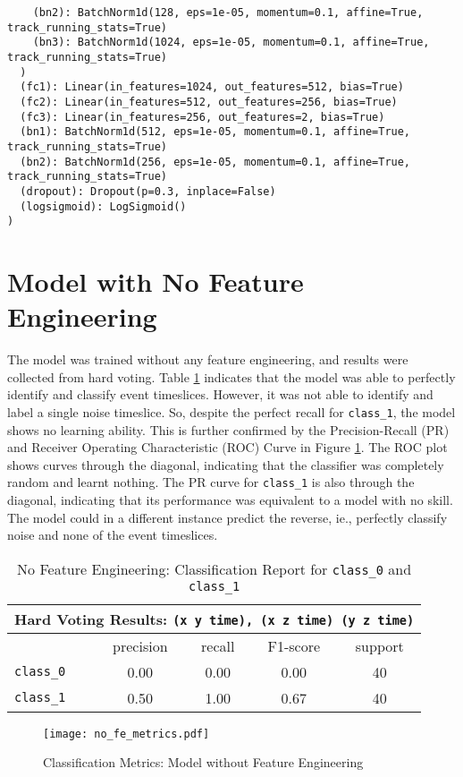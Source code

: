\begin{verbatim}
    (bn2): BatchNorm1d(128, eps=1e-05, momentum=0.1, affine=True,                                             track_running_stats=True)
    (bn3): BatchNorm1d(1024, eps=1e-05, momentum=0.1, affine=True,                                            track_running_stats=True)
  )
  (fc1): Linear(in_features=1024, out_features=512, bias=True)
  (fc2): Linear(in_features=512, out_features=256, bias=True)
  (fc3): Linear(in_features=256, out_features=2, bias=True)
  (bn1): BatchNorm1d(512, eps=1e-05, momentum=0.1, affine=True,                                                 track_running_stats=True)
  (bn2): BatchNorm1d(256, eps=1e-05, momentum=0.1, affine=True,                                                 track_running_stats=True)
  (dropout): Dropout(p=0.3, inplace=False)
  (logsigmoid): LogSigmoid()
)
\end{verbatim}

\section*{Model with No Feature Engineering}
\label{appendix-no-fe}

The model was trained without any feature engineering, and results were collected from hard voting. Table \ref{tab:no_fe_classification_report} indicates that the model was able to perfectly identify and classify event timeslices. However, it was not able to identify and label a single noise timeslice. So, despite the perfect recall for \texttt{class\_1}, the model shows no learning ability. This is further confirmed by the Precision-Recall (PR) and Receiver Operating Characteristic (ROC) Curve in Figure \ref{fig:ncm_no_fe}. The ROC plot shows curves through the diagonal, indicating that the classifier was completely random and learnt nothing. The PR curve for \texttt{class\_1} is also through the diagonal, indicating that its performance was equivalent to a model with no skill. The model could in a different instance predict the reverse, ie., perfectly classify noise and none of the event timeslices.

\begin{table} [ht!]
    \centering
    \begin{tabular}{l c c c c}
    \hline
    \multicolumn{5}{c}{Hard Voting Results: \texttt{(x y time), (x z time) (y z time)}} \\
    \hline
                     & precision & recall & F1-score & support \\
        \texttt{class\_0} & 0.00 &  0.00    & 0.00 & 40\\
        \texttt{class\_1} & 0.50 &  1.00    & 0.67 & 40\\
    \hline
    \end{tabular}
    \caption{No Feature Engineering: Classification Report for \texttt{class\_0} and \texttt{class\_1}}
    \label{tab:no_fe_classification_report}
\end{table}


\begin{figure}
    \centering
    \texttt{[image: no\_fe\_metrics.pdf]}
    \caption{Classification Metrics: Model without Feature Engineering}
    \label{fig:ncm_no_fe}
\end{figure}




\let\cleardoublepage\clearpage